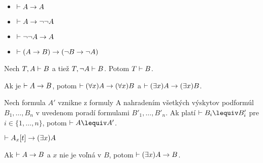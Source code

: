 \begin{veta}
    \noindent
    \begin{itemize}
        \item $\vdash A \rightarrow A$
        \item $\vdash A \rightarrow \neg \neg A$
        \item $\vdash \neg \neg A \rightarrow A$
        \item $\vdash (A \rightarrow B) \rightarrow (\neg B \rightarrow \neg A)$
    \end{itemize}
\end{veta}

\begin{lema}
   Nech $T,A \vdash B$ a tiež $T, \neg A \vdash B$. Potom
   $T \vdash B$.
\end{lema}

\begin{lema}
    Ak je $\vdash A \rightarrow B$, potom
    $\vdash (\forall x)A \rightarrow (\forall x) B$ a
    $\vdash (\exists x)A \rightarrow (\exists x)B$.
\end{lema}

\begin{veta}[O ekvivalencii]
    Nech formula $A'$ vznikne z formuly A nahradením všetkých výskytov 
    podformúl $B_1,\dots ,B_n$ v uvedenom poradí formulami 
    $B'_1, \dots, B'_n$. Ak platí $\provable B_i \lequiv B'_i$ pre
    $i \in \{1,\dots,n\}$, potom $\provable A \lequiv A'$.
\end{veta}

\begin{lema}
    $\vdash A_x[t] \rightarrow (\exists x) A$
\end{lema}

\begin{lema}
    Ak $\vdash A \rightarrow B$ a $x$ nie je voľná v $B$, potom
    $\vdash (\exists x) A \rightarrow B$.
\end{lema}
